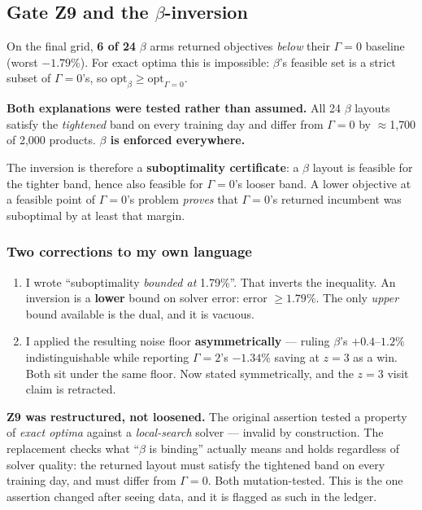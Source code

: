 \documentclass[11pt,a4paper]{article}
\begin{document}
\subsection{Gate Z9 and the \texorpdfstring{$\beta$}{beta}-inversion}

On the final grid, \textbf{6 of 24} $\beta$ arms returned objectives
\emph{below} their $\Gamma=0$ baseline (worst $-1.79\%$). For exact optima this
is impossible: $\beta$'s feasible set is a strict subset of $\Gamma=0$'s, so
$\mathrm{opt}_\beta \ge \mathrm{opt}_{\Gamma=0}$.

\textbf{Both explanations were tested rather than assumed.} All 24 $\beta$
layouts satisfy the \emph{tightened} band on every training day and differ from
$\Gamma=0$ by $\approx$1{,}700 of 2{,}000 products. \textbf{$\beta$ is enforced
everywhere.}

The inversion is therefore a \textbf{suboptimality certificate}: a $\beta$
layout is feasible for the tighter band, hence also feasible for $\Gamma=0$'s
looser band. A lower objective at a feasible point of $\Gamma=0$'s problem
\emph{proves} that $\Gamma=0$'s returned incumbent was suboptimal by at least
that margin.

\subsubsection*{Two corrections to my own language}

\begin{enumerate}
  \item I wrote ``suboptimality \emph{bounded at} 1.79\%''. That inverts the
        inequality. An inversion is a \textbf{lower} bound on solver error:
        error $\ge 1.79\%$. The only \emph{upper} bound available is the dual,
        and it is vacuous.
  \item I applied the resulting noise floor \textbf{asymmetrically} --- ruling
        $\beta$'s $+0.4$--$1.2\%$ indistinguishable while reporting
        $\Gamma=2$'s $-1.34\%$ saving at $z=3$ as a win. Both sit under the
        same floor. Now stated symmetrically, and the $z=3$ visit claim is
        retracted.
\end{enumerate}

\textbf{Z9 was restructured, not loosened.} The original assertion tested a
property of \emph{exact optima} against a \emph{local-search} solver --- invalid
by construction. The replacement checks what ``$\beta$ is binding'' actually
means and holds regardless of solver quality: the returned layout must satisfy
the tightened band on every training day, and must differ from $\Gamma=0$. Both
mutation-tested. This is the one assertion changed after seeing data, and it is
flagged as such in the ledger.
\end{document}
